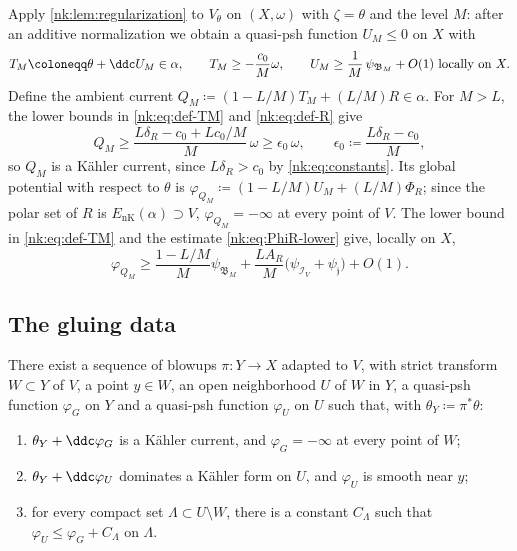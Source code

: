 Apply \cref{nk:lem:regularization} to $V_\theta$ on $(X,\omega)$ with
$\zeta=\theta$ and the level $M$: after an additive
normalization we obtain a quasi-psh function $U_M\le0$ on $X$ with
\begin{equation}\label{nk:eq:def-TM}
  T_M\coloneqq \theta+\ddc U_M\in\alpha,\qquad T_M\ge-\frac{c_0}M\omega,\qquad
  U_M\ge\frac1M\,\psi_{\mathfrak B_M}+O(1)\ \text{locally on }X.
\end{equation}
Define the ambient current
$Q_M\coloneqq (1-L/M)T_M+(L/M)R\in\alpha$.
For $M>L$, the lower bounds in \eqref{nk:eq:def-TM} and
\eqref{nk:eq:def-R} give
\begin{equation}\label{nk:eq:QM-positivity}
  Q_M\ge\frac{L\delta_R-c_0+Lc_0/M}M\,\omega
  \ge\epsilon_0\,\omega,\qquad
  \epsilon_0\coloneqq \frac{L\delta_R-c_0}M,
\end{equation}
so $Q_M$ is a K\"ahler current, since $L\delta_R>c_0$ by
\eqref{nk:eq:constants}. Its global potential with respect to $\theta$ is
$\varphi_{Q_M}\coloneqq (1-L/M)U_M+(L/M)\Phi_R$;
since the polar set of $R$ is ${E_{\mathrm{nK}}}(\alpha)\supset V$, $\varphi_{Q_M}=-\infty$ at every point of $V$. The
lower bound in \eqref{nk:eq:def-TM} and the estimate \eqref{nk:eq:PhiR-lower}
give, locally on $X$,
\begin{equation}\label{nk:eq:phiQ-lower}
  \varphi_{Q_M}\ge\frac{1-L/M}M\psi_{\mathfrak B_M}
   +\frac{LA_R}M\bigl(\psi_{\mathcal I_V}+\psi_{\mathfrak j}\bigr)+O(1).
\end{equation}

\subsection{The gluing data}

\begin{proposition}\label{nk:prop:principalization}
There exist a sequence of
blowups $\pi\colon Y\to X$ adapted to $V$, with strict transform
$W\subset Y$ of $V$, a point $y\in W$, an open neighborhood $U$
of $W$ in $Y$, a quasi-psh function $\varphi_G$ on $Y$ and a
quasi-psh function $\varphi_U$ on $U$ such that, with
$\theta_Y\coloneqq \pi^*\theta$:
\begin{enumerate}[label=\textup{(\arabic*)},leftmargin=*,itemsep=.35em]
\item\label{nk:it:pr-global} $\theta_Y+\ddc\varphi_G$ is a K\"ahler
  current, and $\varphi_G=-\infty$ at every point of $W$;
\item\label{nk:it:pr-local} $\theta_Y+\ddc\varphi_U$ dominates a K\"ahler
  form on $U$, and $\varphi_U$ is smooth near $y$;
\item\label{nk:it:pr-collar} for every compact set
  $\Lambda\subset U\setminus W$, there is a constant $C_\Lambda$
  such that $\varphi_U\le\varphi_G+C_\Lambda$ on $\Lambda$.
\end{enumerate}
\end{proposition}

